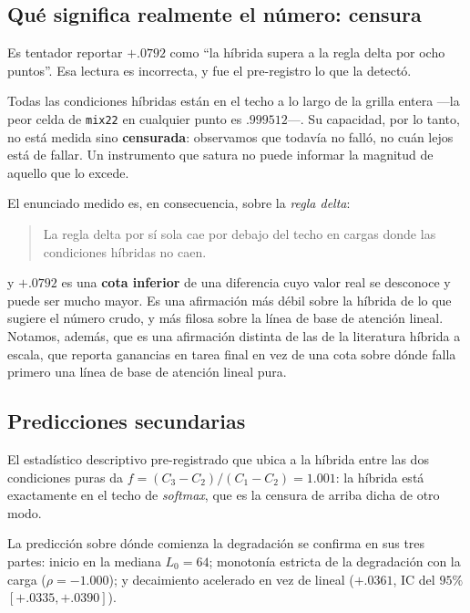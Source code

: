 \documentclass[jou,11pt,donotrepeattitle]{apa7}
\begin{document}
\subsection{Qu\'e significa realmente el n\'umero: censura}

Es tentador reportar $+.0792$ como \enquote{la h\'ibrida supera a la regla delta por ocho
puntos}. Esa lectura es incorrecta, y fue el pre-registro lo que la detect\'o.

Todas las condiciones h\'ibridas est\'an en el techo a lo largo de la grilla entera ---la peor
celda de \texttt{mix22} en cualquier punto es $.999512$---. Su capacidad, por lo tanto, no est\'a
medida sino \textbf{censurada}: observamos que todav\'ia no fall\'o, no cu\'an lejos est\'a de
fallar. Un instrumento que satura no puede informar la magnitud de aquello que lo excede.

El enunciado medido es, en consecuencia, sobre la \emph{regla delta}:

\begin{quote}
La regla delta por s\'i sola cae por debajo del techo en cargas donde las condiciones h\'ibridas
no caen.
\end{quote}

y $+.0792$ es una \textbf{cota inferior} de una diferencia cuyo valor real se desconoce y puede
ser mucho mayor. Es una afirmaci\'on m\'as d\'ebil sobre la h\'ibrida de lo que sugiere el
n\'umero crudo, y m\'as filosa sobre la l\'inea de base de atenci\'on lineal. Notamos, adem\'as,
que es una afirmaci\'on distinta de las de la literatura h\'ibrida a escala, que reporta
ganancias en tarea final en vez de una cota sobre d\'onde falla primero una l\'inea de base de
atenci\'on lineal pura.

\subsection{Predicciones secundarias}

El estad\'istico descriptivo pre-registrado que ubica a la h\'ibrida entre las dos condiciones
puras da $f = (C_3-C_2)/(C_1-C_2) = 1.001$: la h\'ibrida est\'a exactamente en el techo de
\emph{softmax}, que es la censura de arriba dicha de otro modo.

La predicci\'on sobre d\'onde comienza la degradaci\'on se confirma en sus tres partes: inicio
en la mediana $L_0 = 64$; monoton\'ia estricta de la degradaci\'on con la carga
($\rho = -1.000$); y decaimiento acelerado en vez de lineal ($+.0361$, IC del $95\%$
$[+.0335, +.0390]$).
\end{document}
